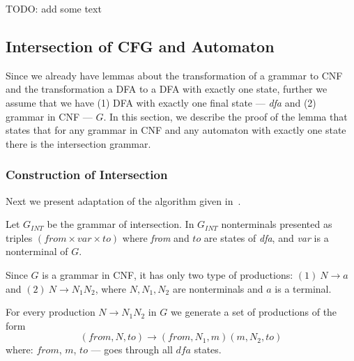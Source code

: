 





TODO: add some text



\subsection{Intersection of CFG and Automaton}

Since we already have lemmas about the transformation of a grammar to CNF and the transformation a DFA to a DFA with exactly one state, further we assume that we have (1) DFA with exactly one final state --- \textit{dfa} and (2) grammar in CNF --- $G$. In this section, we describe the proof of the lemma that states that for any grammar in CNF and any automaton with exactly one state there is the intersection grammar.

\subsubsection{Construction of Intersection}

Next we present adaptation of the algorithm given in~\cite{beigelproof}. 

Let $G_{INT}$ be the grammar of intersection. In $G_{INT}$ nonterminals presented as triples $(from \times var \times to) $ where \textit{from} and $to$ are states of \textit{dfa}, and \textit{var} is a nonterminal of $G$.

Since $G$ is a grammar in CNF, it has only two type of productions: $(1)\ N \to a $ and $(2) \ N \to N_{1} N_{2}$, where $N, N_1, N_2$ are nonterminals and $a$ is a terminal.

For every production $N \to N_1 N_2$ in $G$ we generate a set of productions of the form $$(from, N, to) \to (from, N_1,  m) (m, N_2, to)$$ where: $from$, $m$, $to$ --- goes through all $\textit{dfa}$ states.

